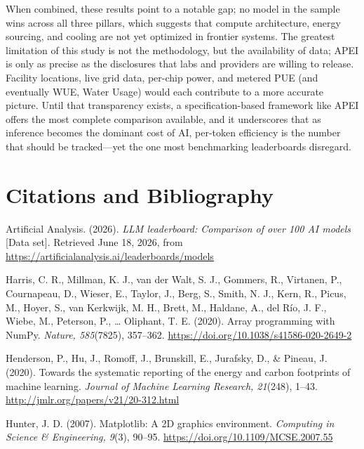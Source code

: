 \documentclass[11pt]{article}
\begin{document}
When combined, these results point to a notable gap; no model in the sample wins across all three pillars, which suggests that compute architecture, energy sourcing, and cooling are not yet optimized in frontier systems. The greatest limitation of this study is not the methodology, but the availability of data; APEI is only as precise as the disclosures that labs and providers are willing to release. Facility locations, live grid data, per-chip power, and metered PUE (and eventually WUE, Water Usage) would each contribute to a more accurate picture. Until that transparency exists, a specification-based framework like APEI offers the most complete comparison available, and it underscores that as inference becomes the dominant cost of AI, per-token efficiency is the number that should be tracked---yet the one most benchmarking leaderboards disregard.

\section*{Citations and Bibliography}

\newcommand{\bibentry}[1]{\noindent\hangindent=0.4in #1\par\medskip}

\bibentry{Artificial Analysis. (2026). \emph{LLM leaderboard: Comparison of over 100 AI models} [Data set]. Retrieved June 18, 2026, from \url{https://artificialanalysis.ai/leaderboards/models}}

\bibentry{Harris, C. R., Millman, K. J., van der Walt, S. J., Gommers, R., Virtanen, P., Cournapeau, D., Wieser, E., Taylor, J., Berg, S., Smith, N. J., Kern, R., Picus, M., Hoyer, S., van Kerkwijk, M. H., Brett, M., Haldane, A., del R\'{i}o, J. F., Wiebe, M., Peterson, P., \ldots{} Oliphant, T. E. (2020). Array programming with NumPy. \emph{Nature, 585}(7825), 357--362. \url{https://doi.org/10.1038/s41586-020-2649-2}}

\bibentry{Henderson, P., Hu, J., Romoff, J., Brunskill, E., Jurafsky, D., \& Pineau, J. (2020). Towards the systematic reporting of the energy and carbon footprints of machine learning. \emph{Journal of Machine Learning Research, 21}(248), 1--43. \url{http://jmlr.org/papers/v21/20-312.html}}

\bibentry{Hunter, J. D. (2007). Matplotlib: A 2D graphics environment. \emph{Computing in Science \& Engineering, 9}(3), 90--95. \url{https://doi.org/10.1109/MCSE.2007.55}}
\end{document}
